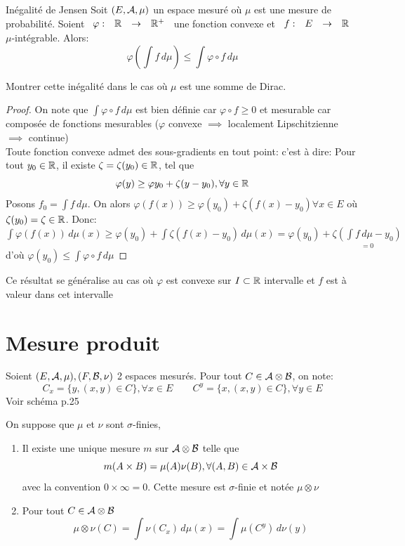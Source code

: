 \documentclass[]{report}
\begin{document}
    \begin{prop}{Inégalité de Jensen}{}
        Soit $(E,\mathcal{A},\mu)$ un espace mesuré où $\mu$ est une mesure de probabilité. Soient $\begin{array}{ccccc} \varphi : & \mathbb{R} & \to & \mathbb{R}^+ \end{array}$ une fonction convexe et $\begin{array}{ccccc} f : & E & \to & \mathbb{R} \end{array}$ $\mu$-intégrable. Alors:
        \[\varphi\left(\int f\,d\mu\right)\le \int \varphi\circ f\,d\mu\]
    \end{prop}

    \begin{exo}{}{}
        Montrer cette inégalité dans le cas où $\mu$ est une somme de Dirac.
    \end{exo}

    \begin{proof}
        On note que $\int \varphi\circ f\,d\mu$ est bien définie car $\varphi\circ f\ge 0 $ et mesurable car composée de fonctions mesurables ($\varphi$ convexe $\implies$ localement Lipschitzienne $\implies$ continue)\\
        Toute fonction convexe admet des sous-gradients en tout point: c'est à dire: Pour tout $y_0\in \mathbb{R}$, il existe $\zeta=\zeta(y_0)\in\mathbb{R}$, tel que
        \[\varphi(y)\ge\varphi{y_0}+\zeta(y-y_0),\forall y\in \mathbb{R}\]
        Posons $f_0=\int f\,d\mu$. On alors $\varphi(f(x))\ge \varphi(y_0)+\zeta(f(x)-y_0)\forall x\in E$ où $\zeta(y_0)=\zeta\in \mathbb{R}$. Donc: $\int \varphi(f(x))\,d\mu(x)\ge \varphi(y_0)+\int \zeta(f(x)-y_0)\,d\mu(x)=\varphi(y_0)+\underset{=0}{\zeta(\int f\,d\mu-y_0)}$ d'où $\varphi(y_0)\le \int \varphi\circ f\,d\mu$
    \end{proof}

    \begin{re}{}{}
        Ce résultat se généralise au cas où $\varphi$ est convexe sur $I\subset \mathbb{R}$ intervalle et $f$ est à valeur dans cet intervalle    
    \end{re}

    \section{Mesure produit}

    \begin{df}{}{}
        Soient $(E,\mathcal{A},\mu),(F,\mathcal{B},\nu)$ 2 espaces mesurés. Pour tout $C\in \mathcal{A}\otimes \mathcal{B}$, on note:
        \[C_x=\{y,(x,y)\in C\},\forall x\in E\qquad C^y=\{x,(x,y)\in C\},\forall y\in E\]
        Voir schéma p.25
    \end{df}

    \begin{dfprop}{}{}
        On suppose que $\mu$ et $\nu$ sont $\sigma$-finies,
        \begin{enumerate}
            \item Il existe une unique mesure $m$ sur $\mathcal{A}\otimes\mathcal{B}$ telle que
            \[m(A\times B)=\mu(A)\nu(B),\forall (A,B)\in \mathcal{A}\times \mathcal{B}\]
            avec la convention $0\times \infty=0$. Cette mesure est $\sigma$-finie et notée $\mu\otimes\nu$
            \item Pour tout $C\in\mathcal{A}\otimes \mathcal{B}$
            \[\mu\otimes\nu(C)=\int\nu(C_x)\,d\mu(x)=\int \mu(C^y)\,d\nu(y)\]
        \end{enumerate}
    \end{dfprop}
\end{document}
